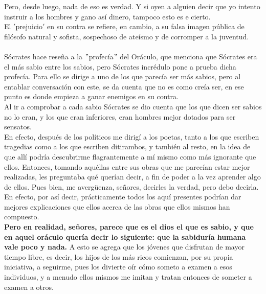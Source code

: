 \begin{multicols}{2}
\begin{enumerate}[\bfseries 1.]
	    Pero, desde luego, nada de eso es verdad. Y si oyen a alguien decir que yo intento instruir a los hombres y gano así dinero, tampoco esto es e cierto. \\ 
	    El $'$prejuicio$'$ en su contra se refiere, en cambio, a su falsa imagen pública de filósofo natural y sofista, sospechoso de ateísmo y de corromper a la juventud.\\\\
	    Sócrates hace reseña a la $"$profecía$"$ del Oráculo, que menciona que Sócrates era el más sabio entre los sabios, pero Sócrates incrédulo pone a prueba dicha profecía. Para ello se dirige a uno de los que parecía ser más sabios, pero al entablar conversación con este, se da cuenta que no es como creía ser, en ese punto es donde empieza a ganar enemigos en su contra.\\
	    Al ir a comprobar a cada sabio Sócrates se dio cuenta que los que dicen ser sabios no lo eran, y los que eran inferiores, eran hombres mejor dotados para ser sensatos.\\
	    En efecto, después de los políticos me dirigí a los poetas, tanto a los que escriben tragedias como a los que escriben ditirambos, y también al resto, en la idea de que allí podría descubrirme flagrantemente a mí mismo como más ignorante que ellos. Entonces, tomando aquéllas entre sus obras que me parecían estar mejor realizadas, les preguntaba qué querían decir, a fin de poder a la vez aprender algo de ellos. Pues bien, me avergüenza, señores, decirles la verdad, pero debo decirla. En efecto, por así decir, prácticamente todos los aquí presentes podrían dar mejores explicaciones que ellos acerca de las obras que ellos mismos han compuesto.\\
	    \textbf{Pero en realidad, señores, parece que es el dios el que es sabio, y que en aquel oráculo quería decir lo siguiente: que la sabiduría humana vale poco y nada.} A esto se agrega que los jóvenes que disfrutan de mayor tiempo libre, es decir, los hijos de los más ricos comienzan, por su propia iniciativa, a seguirme, pues los divierte oír cómo someto a examen a esos individuos, y a menudo ellos mismos me imitan y tratan entonces de someter a examen a otros.


\end{enumerate}
\end{multicols}
